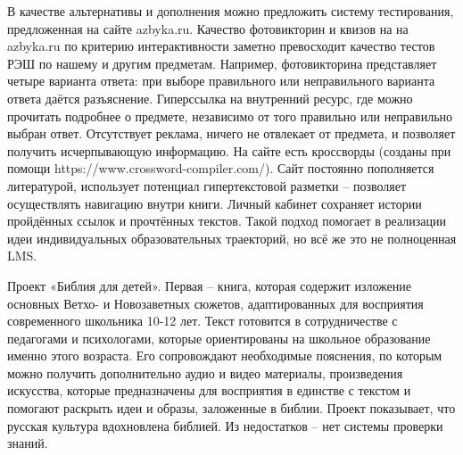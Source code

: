 В качестве альтернативы и дополнения можно предложить систему тестирования, предложенная на сайте azbyka.ru. Качество фотовикторин и квизов на на azbyka.ru по критерию интерактивности заметно превосходит качество тестов РЭШ по нашему и другим предметам. Например, фотовикторина представляет четыре варианта ответа: при выборе правильного или неправильного варианта ответа даётся разъяснение. Гиперссылка на внутренний ресурс, где можно прочитать подробнее о предмете, независимо от того правильно или неправильно выбран ответ. Отсутствует реклама, ничего не отвлекает от предмета, и позволяет получить исчерпывающую информацию. На сайте есть кроссворды (созданы при помощи https://www.crossword-compiler.com/). Сайт постоянно пополняется литературой, использует потенциал гипертекстовой разметки – позволяет осуществлять навигацию внутри книги. Личный кабинет сохраняет истории пройдённых ссылок и прочтённых текстов. Такой подход помогает в реализации идеи индивидуальных образовательных траекторий, но всё же это не полноценная LMS.

Проект «Библия для детей»\cite{biblechild}. Первая – книга, которая содержит изложение основных Ветхо- и Новозаветных сюжетов, адаптированных для восприятия современного школьника 10-12 лет. Текст готовится в сотрудничестве с педагогами и психологами, которые ориентированы на школьное образование именно этого возраста. Его сопровождают необходимые пояснения, по которым можно получить дополнительно аудио и видео материалы, произведения искусства, которые предназначены для восприятия в единстве с текстом и помогают раскрыть идеи и образы, заложенные в библии. Проект показывает, что русская культура вдохновлена библией. Из недостатков – нет системы проверки знаний.

